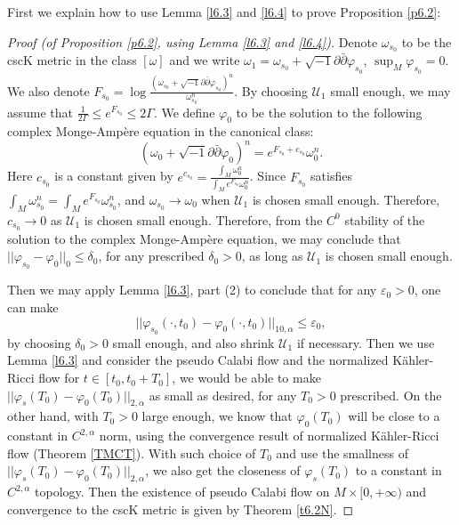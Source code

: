 \documentclass[11pt]{amsart}
\numberwithin{equation}{section}
\newcommand \eps{\varepsilon}
\begin{document}
First we explain how to use Lemma \ref{l6.3} and \ref{l6.4} to prove Proposition \ref{p6.2}:
\begin{proof}[Proof (of Proposition \ref{p6.2},  using Lemma \ref{l6.3} and \ref{l6.4})]
 Denote $\omega_{s_0}$ to be the cscK metric in the class $[\omega]$ and we write $\omega_1=\omega_{s_0}+\sqrt{-1}\partial\bar{\partial}\varphi_{s_0}$,  $\sup_M\varphi_{s_0}=0$.  We also denote $F_{s_0}=\log\frac{(\omega_{s_0}+\sqrt{-1}\partial\bar{\partial}\varphi_{s_0})^n}{\omega_{s_0}^n}$.  By choosing $\mathcal{U}_1$ small enough,  we may assume that $\frac{1}{2\Gamma}\le e^{F_{s_0}}\le 2\Gamma$.  We define $\varphi_0$ to be the solution to the following complex Monge-Ampère equation in the canonical class:
\begin{equation*}
(\omega_0+\sqrt{-1}\partial\bar{\partial}\varphi_0)^n=e^{F_{s_0}+c_{s_0}}\omega_0^n.
\end{equation*}
Here $c_{s_0}$ is a constant given by $e^{c_{s_0}}=\frac{\int_M\omega_0^n}{\int_Me^{F_{s_0}}\omega_0^n}$.  Since $F_{s_0}$ satisfies $\int_M\omega_{s_0}^n=\int_Me^{F_{s_0}}\omega_{s_0}^n$,  and $\omega_{s_0}\rightarrow \omega_0$ when $\mathcal{U}_1$ is chosen small enough.  Therefore,  $c_{s_0}\rightarrow 0$ as $\mathcal{U}_1$ is chosen small enough.  Therefore,  from the $C^0$ stability of the solution to the complex Monge-Ampère equation,  we may conclude that $||\varphi_{s_0}-\varphi_0||_0\le \delta_0$,  for any prescribed $\delta_0>0$,  as long as $\mathcal{U}_1$ is chosen small enough. 

Then we may apply Lemma \ref{l6.3},  part (2) to conclude that for any $\eps_0>0$,  one can make
\begin{equation*}
||\varphi_{s_0}(\cdot,t_0)-\varphi_0(\cdot,t_0)||_{10,\alpha}\le \eps_0,
\end{equation*}
by choosing $\delta_0>0$ small enough,  and also shrink $\mathcal{U}_1$ if necessary.  Then we use Lemma \ref{l6.3} and consider the pseudo Calabi flow and the normalized K\"ahler-Ricci flow for $t\in [t_0,t_0+T_0]$,  we would be able to make $||\varphi_s(T_0)-\varphi_0(T_0)||_{2,\alpha}$ as small as desired,  for any $T_0>0$ prescribed.  On the other hand,  with $T_0>0$ large enough,  we know that $\varphi_0(T_0)$ will be close to a constant in $C^{2,\alpha}$ norm,  using the convergence result of normalized K\"ahler-Ricci flow (Theorem \ref{TMCT}).   With such choice of $T_0$ and use the smallness of $||\varphi_s(T_0)-\varphi_0(T_0)||_{2,\alpha}$,  we also get the closeness of $\varphi_s(T_0)$ to a constant in $C^{2,\alpha}$ topology.  Then the existence of pseudo Calabi flow on $M\times [0,+\infty)$ and convergence to the cscK metric is given by Theorem \ref{t6.2N}.
\end{proof}
\end{document}
